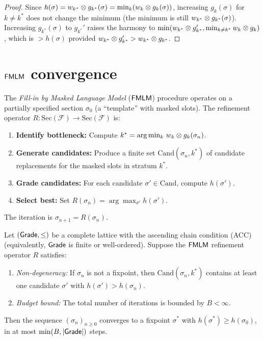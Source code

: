 \begin{proof}
Since $h(\sigma) = w_{k^*} \otimes g_{k^*}(\sigma) =
\min_k(w_k \otimes g_k(\sigma))$, increasing $g_k(\sigma)$ for
$k \neq k^*$ does not change the minimum (the minimum is still
$w_{k^*} \otimes g_{k^*}(\sigma)$).  Increasing $g_{k^*}(\sigma)$ to
$g_{k^*}'$ raises the harmony to
$\min(w_{k^*} \otimes g_{k^*}', \min_{k \neq k^*} w_k \otimes g_k)$,
which is $> h(\sigma)$ provided $w_{k^*} \otimes g_{k^*}' >
w_{k^*} \otimes g_{k^*}$.
\end{proof}

\section{$\mathsf{FMLM}$ convergence}
\label{sec:fmlm}

\begin{definition}
\label{def:fmlm-operator}
The \emph{Fill-in by Masked Language Model} ($\mathsf{FMLM}$) procedure
operates on a partially specified section $\sigma_0$ (a ``template''
with masked slots).  The refinement operator
$R : \mathrm{Sec}(\mathcal{F}) \to \mathrm{Sec}(\mathcal{F})$ is:
\begin{enumerate}[label=(\arabic*),nosep]
\item \textbf{Identify bottleneck:} Compute $k^* =
  \arg\min_k\, w_k \otimes g_k(\sigma_n)$.
\item \textbf{Generate candidates:} Produce a finite set
  $\mathrm{Cand}(\sigma_n, k^*)$ of candidate replacements for the
  masked slots in stratum $k^*$.
\item \textbf{Grade candidates:} For each candidate $\sigma' \in
  \mathrm{Cand}$, compute $h(\sigma')$.
\item \textbf{Select best:} Set $R(\sigma_n) = \arg\max_{\sigma'}
  h(\sigma')$.
\end{enumerate}
The iteration is $\sigma_{n+1} = R(\sigma_n)$.
\end{definition}

\begin{theorem}
\label{thm:fmlm}
Let $(\mathsf{Grade}, \leq)$ be a complete lattice with the ascending chain
condition (ACC) (equivalently, $\mathsf{Grade}$ is finite or well-ordered).
Suppose the $\mathsf{FMLM}$ refinement operator $R$ satisfies:
\begin{enumerate}[label=(\roman*),nosep]
\item \emph{Non-degeneracy:} If $\sigma_n$ is not a fixpoint, then
  $\mathrm{Cand}(\sigma_n, k^*)$ contains at least one candidate
  $\sigma'$ with $h(\sigma') > h(\sigma_n)$.
\item \emph{Budget bound:} The total number of iterations is bounded
  by $B < \infty$.
\end{enumerate}
Then the sequence $(\sigma_n)_{n \geq 0}$ converges to a fixpoint
$\sigma^*$ with $h(\sigma^*) \geq h(\sigma_0)$, in at most
$\min(B, |\mathsf{Grade}|)$ steps.
\end{theorem}

